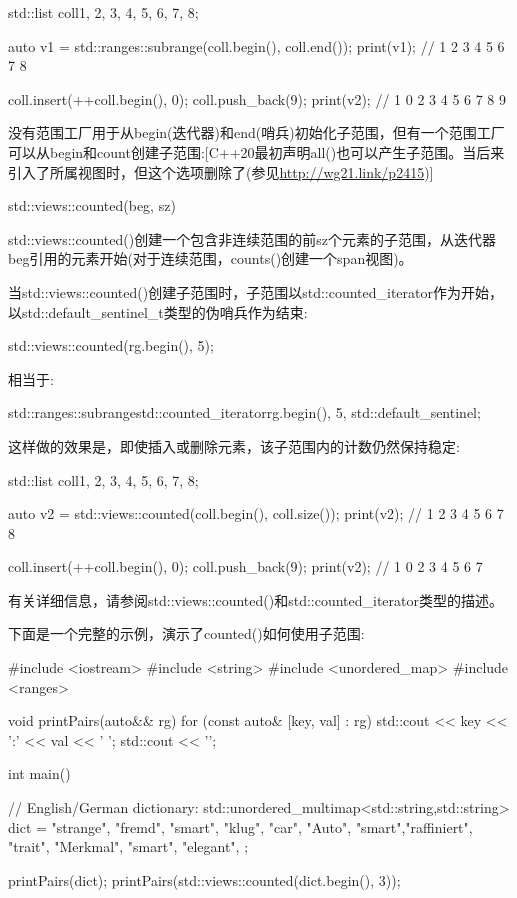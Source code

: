 \begin{cpp}
std::list coll{1, 2, 3, 4, 5, 6, 7, 8};

auto v1 = std::ranges::subrange(coll.begin(), coll.end());
print(v1); // 1 2 3 4 5 6 7 8

coll.insert(++coll.begin(), 0);
coll.push_back(9);
print(v2); // 1 0 2 3 4 5 6 7 8 9
\end{cpp}


没有范围工厂用于从begin(迭代器)和end(哨兵)初始化子范围，但有一个范围工厂可以从begin和count创建子范围:[C++20最初声明all()也可以产生子范围。当后来引入了所属视图时，但这个选项删除了(参见\url{http://wg21.link/p2415})]

\begin{cpp}
std::views::counted(beg, sz)
\end{cpp}

std::views::counted()创建一个包含非连续范围的前sz个元素的子范围，从迭代器beg引用的元素开始(对于连续范围，counts()创建一个span视图)。

当std::views::counted()创建子范围时，子范围以std::counted\_iterator作为开始，以std::default\_sentinel\_t类型的伪哨兵作为结束:

\begin{cpp}
std::views::counted(rg.begin(), 5);
\end{cpp}

相当于:

\begin{cpp}
std::ranges::subrange{std::counted_iterator{rg.begin(), 5},
	std::default_sentinel};
\end{cpp}

这样做的效果是，即使插入或删除元素，该子范围内的计数仍然保持稳定:

\begin{cpp}
std::list coll{1, 2, 3, 4, 5, 6, 7, 8};

auto v2 = std::views::counted(coll.begin(), coll.size());
print(v2); // 1 2 3 4 5 6 7 8

coll.insert(++coll.begin(), 0);
coll.push_back(9);
print(v2); // 1 0 2 3 4 5 6 7
\end{cpp}

有关详细信息，请参阅std::views::counted()和std::counted\_iterator类型的描述。

下面是一个完整的示例，演示了counted()如何使用子范围:


\begin{cpp}
#include <iostream>
#include <string>
#include <unordered_map>
#include <ranges>

void printPairs(auto&& rg)
{
	for (const auto& [key, val] : rg) {
		std::cout << key << ':' << val << ' ';
	}
	std::cout << '\n';
}

int main()
{
	// English/German dictionary:
	std::unordered_multimap<std::string,std::string> dict = {
		{"strange", "fremd"},
		{"smart", "klug"},
		{"car", "Auto"},
		{"smart","raffiniert"},
		{"trait", "Merkmal"},
		{"smart", "elegant"},
	};
	
	printPairs(dict);
	printPairs(std::views::counted(dict.begin(), 3));
}
\end{cpp}

